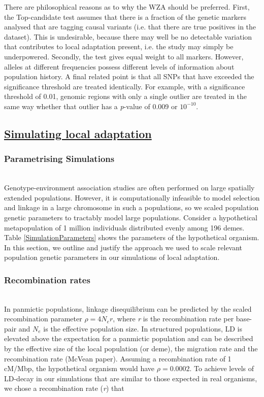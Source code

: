 \documentclass[11pt,twoside,lineno]{GSA_format}
\begin{document}
There are philosophical reasons as to why the WZA should be preferred. First, the Top-candidate test assumes that there is a fraction of the genetic markers analysed that are tagging causal variants (i.e. that there are true positives in the dataset). This is undesirable, because there may well be no detectable variation that contributes to local adaptation present, i.e. the study may simply be underpowered. Secondly, the test gives equal weight to all markers. However, alleles at different frequencies possess different levels of information about population history. A final related point is that all SNPs that have exceeded the significance threshold are treated identically. For example, with a significance threshold of 0.01, genomic regions with only a single outlier are treated in the same way whether that outlier has a \textit{p}-value of 0.009 or $10^{-10}$.

\subsection{\underline{Simulating local adaptation}} 

\subsubsection{Parametrising Simulations} \\

Genotype-environment association studies are often performed on large spatially extended populations. However, it is computationally infeasible to model selection and linkage in  a large chromosome in such a populations, so we scaled population genetic parameters to tractably model large populations. Consider a hypothetical metapopulation of 1 million individuals distributed evenly among 196 demes. Table \ref{SimulationParameters} shows the parameters of the hypothetical organism. In this section, we outline and justify the approach we used to scale relevant population genetic parameters in our simulations of local adaptation. 

\subsubsection{Recombination rates} \\

In panmictic populations, linkage disequilibrium can be predicted by the scaled recombination parameter $\rho = 4N_er$, where \textit{r} is the recombination rate per base-pair and $N_e$ is the effective population size. In structured populations, LD is elevated above the expectation for a panmictic population and can be described by the effective size of the local population (or deme), the migration rate and the recombination rate (McVean paper). Assuming a recombination rate of 1 cM/Mbp, the hypothetical organism would have $\rho = 0.0002$. 
To achieve levels of LD-decay in our simulations that are similar to those expected in real organisms, we chose a recombination rate (\textit{r}) that 
\end{document}

